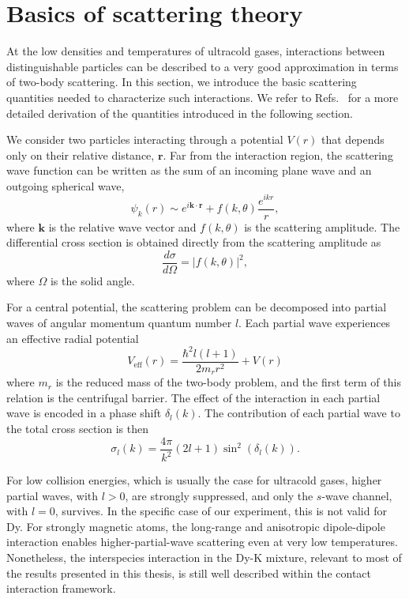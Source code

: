 \section{Basics of scattering theory}
\label{sec:ScatteringTheo}

At the low densities and temperatures of ultracold gases, interactions between distinguishable particles can be described to a very good approximation in terms of two-body scattering. In this section, we introduce the basic scattering quantities needed to characterize such interactions. We refer to Refs.~\cite{dalibard2021iba, Sakurai1994book} for a more detailed derivation of the quantities introduced in the following section.

We consider two particles interacting through a potential $V(r)$ that depends only on their relative distance, $\mathbf{r}$. Far from the interaction region, the scattering wave function can be written as the sum of an incoming plane wave and an outgoing spherical wave,
\begin{equation}
	\psi_k(r)\sim e^{i \mathbf{k}\cdot\mathbf{r} }+f(k,\theta)\frac{e^{ikr}}{r},
	\label{eq:wavefunScatt}
\end{equation}
where $\mathbf{k}$ is the relative wave vector and $f(k,\theta)$ is the scattering amplitude. The differential cross section is obtained directly from the scattering amplitude as
\begin{equation}
\frac{d\sigma}{d\Omega}=|f(k,\theta)|^2,
\label{eq:diffCrossSec}
\end{equation}
where $\Omega$ is the solid angle.	
	
For a central potential, the scattering problem can be decomposed into partial waves of angular momentum quantum number $l$. Each partial wave experiences an effective radial potential	
\begin{equation}
	V_{\mathrm{eff}}(r)=\frac{\hbar^2l(l+1)}{2m_rr^2}+V(r)
	\label{eq:effPot}
\end{equation}
where $m_r$ is the reduced mass of the two-body problem, and the first term of this relation is the centrifugal barrier. The effect of the interaction in each partial wave is encoded in a phase shift $\delta_l(k)$. The contribution of each partial wave to the total cross section is then
\begin{equation}
	\sigma_l(k)=\frac{4\pi}{k^2}(2l+1)\sin^2(\delta_l(k)).
	\label{eq:crossSecpartialWave}
\end{equation}

For low collision energies, which is usually the case for ultracold gases, higher partial waves, with $l>0$, are strongly suppressed, and only the $s$-wave channel, with $l=0$, survives. In the specific case of our experiment, this is not valid for Dy. For strongly magnetic atoms, the long-range and anisotropic dipole-dipole interaction enables higher-partial-wave scattering even at very low temperatures. Nonetheless, the interspecies interaction in the Dy-K mixture, relevant to most of the results presented in this thesis, is still well described within the contact interaction framework.

